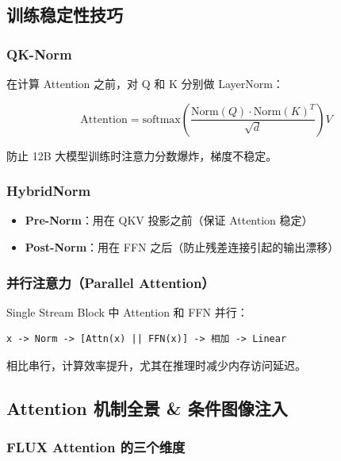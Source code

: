 \subsection{训练稳定性技巧}

\subsubsection{QK-Norm}

在计算 Attention 之前，对 Q 和 K 分别做 LayerNorm：

$$\text{Attention} = \text{softmax}\left(\frac{\text{Norm}(Q) \cdot \text{Norm}(K)^T}{\sqrt{d}}\right) V$$

防止 12B 大模型训练时注意力分数爆炸，梯度不稳定。

\subsubsection{HybridNorm}

\begin{itemize}[leftmargin=1.5em]
  \item \textbf{Pre-Norm}：用在 QKV 投影之前（保证 Attention 稳定）
  \item \textbf{Post-Norm}：用在 FFN 之后（防止残差连接引起的输出漂移）
\end{itemize}

\subsubsection{并行注意力（Parallel Attention）}

Single Stream Block 中 Attention 和 FFN 并行：

\begin{lstlisting}
x -> Norm -> [Attn(x) || FFN(x)] -> 相加 -> Linear
\end{lstlisting}

相比串行，计算效率提升，尤其在推理时减少内存访问延迟。

\subsection{Attention 机制全景 \& 条件图像注入}

\subsubsection{FLUX Attention 的三个维度}


